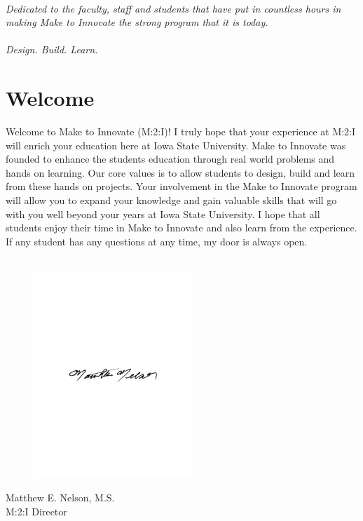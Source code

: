 \documentclass[nohyper,nobib]{tufte-book}
\begin{document}
\tableofcontents

\listoffigures

\listoftables

\cleardoublepage
~\vfill
\begin{doublespace}
\noindent\fontsize{18}{22}\selectfont\itshape
\nohyphenation
Dedicated to the faculty, staff and students that have put in countless hours in making Make to Innovate the strong program that it is today.
\ \\ \ \\
Design.  Build.  Learn.
\end{doublespace}
\vfill
\vfill


\cleardoublepage
\chapter*{Welcome}

Welcome to Make to Innovate (M:2:I)!  I truly hope that your experience at M:2:I will enrich your education here at Iowa State University.  Make to Innovate was founded to enhance the students education through real world problems and hands on learning.  Our core values is to allow students to design, build and learn from these hands on projects.  Your involvement in the Make to Innovate program will allow you to expand your knowledge and gain valuable skills that will go with you well beyond your years at Iowa State University.  I hope that all students enjoy their time in Make to Innovate and also learn from the experience.  If any student has any questions at any time, my door is always open.
\ \\
\ \\ 
\begin{figure}[h]
  \includegraphics[width=6cm]{images/my_signature.pdf}
\end{figure}
Matthew E. Nelson, M.S.\ \\
M:2:I Director
\end{document}

